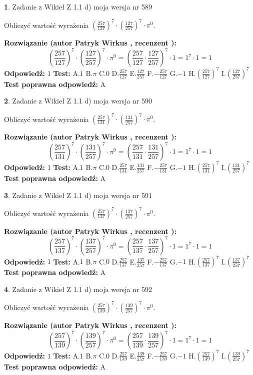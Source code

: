 \documentclass[12pt, a4paper]{article}
\theoremstyle{definition} %
\newtheorem{zad}{}
\newcommand{\zadStart}[1]{\begin{zad}#1\newline}
\newcommand{\zadStop}{\end{zad}}
\newcommand{\rozwStart}[2]{\noindent \textbf{Rozwiązanie (autor #1 , recenzent #2): }\newline}
\newcommand{\rozwStop}{\newline}
\newcommand{\odpStart}{\noindent \textbf{Odpowiedź:}\newline}
\newcommand{\odpStop}{\newline}
\newcommand{\testStart}{\noindent \textbf{Test:}\newline}
\newcommand{\testStop}{\newline}
\newcommand{\kluczStart}{\noindent \textbf{Test poprawna odpowiedź:}\newline}
\newcommand{\kluczStop}{\newline}
\begin{document}
\zadStart{Zadanie z Wikieł Z 1.1 d) moja wersja nr 589}

Obliczyć wartość wyrażenia $(\frac{257}{127})^{7} \cdot (\frac{127}{257})^{7} \cdot \pi^{0}$.
\zadStop
\rozwStart{Patryk Wirkus}{}
$$(\frac{257}{127})^{7} \cdot (\frac{127}{257})^{7} \cdot \pi^{0} = (\frac{257}{127} \cdot \frac{127}{257})^{7} \cdot 1 = 1^{7} \cdot 1 = 1$$
\rozwStop
\odpStart
$1$
\odpStop
\testStart
A.$1$ B.$\pi$ C.$0$ D.$\frac{257}{127}$ E.$\frac{127}{257}$
F.$-\frac{257}{127}$ G.$-1$
H.$(\frac{257}{127})^{7}$
I.$(\frac{127}{257})^{7}$
\testStop
\kluczStart
A
\kluczStop



\zadStart{Zadanie z Wikieł Z 1.1 d) moja wersja nr 590}

Obliczyć wartość wyrażenia $(\frac{257}{131})^{7} \cdot (\frac{131}{257})^{7} \cdot \pi^{0}$.
\zadStop
\rozwStart{Patryk Wirkus}{}
$$(\frac{257}{131})^{7} \cdot (\frac{131}{257})^{7} \cdot \pi^{0} = (\frac{257}{131} \cdot \frac{131}{257})^{7} \cdot 1 = 1^{7} \cdot 1 = 1$$
\rozwStop
\odpStart
$1$
\odpStop
\testStart
A.$1$ B.$\pi$ C.$0$ D.$\frac{257}{131}$ E.$\frac{131}{257}$
F.$-\frac{257}{131}$ G.$-1$
H.$(\frac{257}{131})^{7}$
I.$(\frac{131}{257})^{7}$
\testStop
\kluczStart
A
\kluczStop



\zadStart{Zadanie z Wikieł Z 1.1 d) moja wersja nr 591}

Obliczyć wartość wyrażenia $(\frac{257}{137})^{7} \cdot (\frac{137}{257})^{7} \cdot \pi^{0}$.
\zadStop
\rozwStart{Patryk Wirkus}{}
$$(\frac{257}{137})^{7} \cdot (\frac{137}{257})^{7} \cdot \pi^{0} = (\frac{257}{137} \cdot \frac{137}{257})^{7} \cdot 1 = 1^{7} \cdot 1 = 1$$
\rozwStop
\odpStart
$1$
\odpStop
\testStart
A.$1$ B.$\pi$ C.$0$ D.$\frac{257}{137}$ E.$\frac{137}{257}$
F.$-\frac{257}{137}$ G.$-1$
H.$(\frac{257}{137})^{7}$
I.$(\frac{137}{257})^{7}$
\testStop
\kluczStart
A
\kluczStop



\zadStart{Zadanie z Wikieł Z 1.1 d) moja wersja nr 592}

Obliczyć wartość wyrażenia $(\frac{257}{139})^{7} \cdot (\frac{139}{257})^{7} \cdot \pi^{0}$.
\zadStop
\rozwStart{Patryk Wirkus}{}
$$(\frac{257}{139})^{7} \cdot (\frac{139}{257})^{7} \cdot \pi^{0} = (\frac{257}{139} \cdot \frac{139}{257})^{7} \cdot 1 = 1^{7} \cdot 1 = 1$$
\rozwStop
\odpStart
$1$
\odpStop
\testStart
A.$1$ B.$\pi$ C.$0$ D.$\frac{257}{139}$ E.$\frac{139}{257}$
F.$-\frac{257}{139}$ G.$-1$
H.$(\frac{257}{139})^{7}$
I.$(\frac{139}{257})^{7}$
\testStop
\kluczStart
A
\kluczStop
\end{document}
